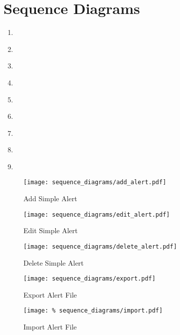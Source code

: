 \chapter{Sequence Diagrams}\label{ch:sequence_diagrams}

\begin{enumerate}
    \item~
    \item~
    \item~
    \item~
    \item~
    \item~
    \item~
    \item~
    \item~
\end{enumerate}

\begin{figure}[]
	\centering
    \caption{Add Simple Alert}\label{fig:sd_add_simple_alert}
    \texttt{[image: sequence\_diagrams/add\_alert.pdf]}
\end{figure}

\begin{figure}[]
	\centering
    \caption{Edit Simple Alert}\label{fig:sd_edit_simple_alert}
    \texttt{[image: sequence\_diagrams/edit\_alert.pdf]}
\end{figure}

\begin{figure}[]
	\centering
    \caption{Delete Simple Alert}\label{fig:sd_delete_simple_alert}
    \texttt{[image: sequence\_diagrams/delete\_alert.pdf]}
\end{figure}

\begin{figure}[]
	\centering
    \caption{Export Alert File}\label{fig:sd_export_alert_file}
    \texttt{[image: sequence\_diagrams/export.pdf]}
\end{figure}

\begin{figure}[]
	\centering
    \caption{Import Alert File}\label{fig:sd_import_alert_file}
    \texttt{[image: \%
    sequence\_diagrams/import.pdf]}
\end{figure}

